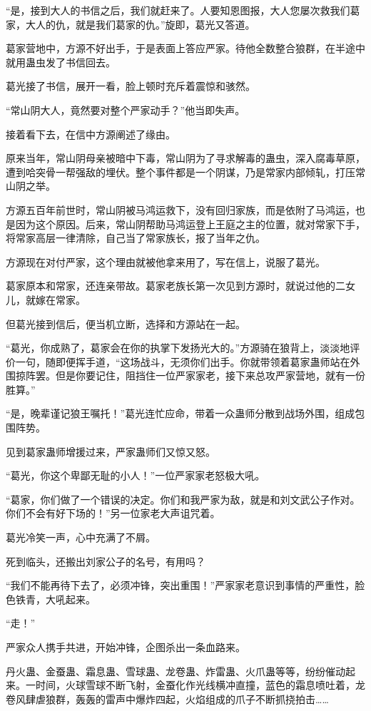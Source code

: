 \begin{this_body}
“是，接到大人的书信之后，我们就赶来了。人要知恩图报，大人您屡次救我们葛家，大人的仇，就是我们葛家的仇。”旋即，葛光又答道。

葛家营地中，方源不好出手，于是表面上答应严家。待他全数整合狼群，在半途中就用蛊虫发了书信回去。

葛光接了书信，展开一看，脸上顿时充斥着震惊和骇然。

“常山阴大人，竟然要对整个严家动手？”他当即失声。

接着看下去，在信中方源阐述了缘由。

原来当年，常山阴母亲被暗中下毒，常山阴为了寻求解毒的蛊虫，深入腐毒草原，遭到哈突骨一帮强敌的埋伏。整个事件都是一个阴谋，乃是常家内部倾轧，打压常山阴之举。

方源五百年前世时，常山阴被马鸿运救下，没有回归家族，而是依附了马鸿运，也是因为这个原因。后来，常山阴帮助马鸿运登上王庭之主的位置，就对常家下手，将常家高层一律清除，自己当了常家族长，报了当年之仇。

方源现在对付严家，这个理由就被他拿来用了，写在信上，说服了葛光。

葛家原本和常家，还连亲带故。葛家老族长第一次见到方源时，就说过他的二女儿，就嫁在常家。

但葛光接到信后，便当机立断，选择和方源站在一起。

“葛光，你成熟了，葛家会在你的执掌下发扬光大的。”方源骑在狼背上，淡淡地评价一句，随即便挥手道，“这场战斗，无须你们出手。你就带领着葛家蛊师站在外围掠阵罢。但是你要记住，阻挡住一位严家家老，接下来总攻严家营地，就有一份胜算。”

“是，晚辈谨记狼王嘱托！”葛光连忙应命，带着一众蛊师分散到战场外围，组成包围阵势。

见到葛家蛊师增援过来，严家蛊师们又惊又怒。

“葛光，你这个卑鄙无耻的小人！”一位严家家老怒极大吼。

“葛家，你们做了一个错误的决定。你们和我严家为敌，就是和刘文武公子作对。你们不会有好下场的！”另一位家老大声诅咒着。

葛光冷笑一声，心中充满了不屑。

死到临头，还搬出刘家公子的名号，有用吗？

“我们不能再待下去了，必须冲锋，突出重围！”严家家老意识到事情的严重性，脸色铁青，大吼起来。

“走！”

严家众人携手共进，开始冲锋，企图杀出一条血路来。

丹火蛊、金蚕蛊、霜息蛊、雪球蛊、龙卷蛊、炸雷蛊、火爪蛊等等，纷纷催动起来。一时间，火球雪球不断飞射，金蚕化作光线横冲直撞，蓝色的霜息喷吐着，龙卷风肆虐狼群，轰轰的雷声中爆炸四起，火焰组成的爪子不断抓挠拍击……


\end{this_body}
